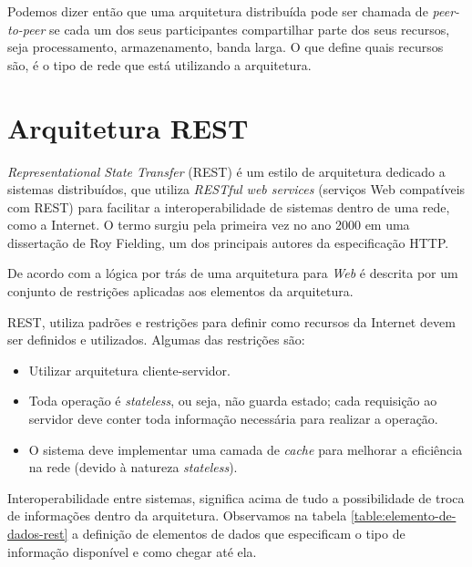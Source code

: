 Podemos dizer então que uma arquitetura distribuída pode ser chamada de \textit{peer-to-peer} se cada um dos seus participantes compartilhar parte dos seus recursos, seja processamento,  armazenamento, banda larga. O que define quais recursos são, é o tipo de rede que está utilizando a arquitetura. 

\section{Arquitetura REST}

\textit{Representational State Transfer} (REST) é um estilo de arquitetura dedicado a sistemas distribuídos, que utiliza \textit{RESTful web services} (serviços Web compatíveis com REST) para facilitar a interoperabilidade de sistemas dentro de uma rede, como a Internet. O termo surgiu pela primeira vez no ano 2000 em uma dissertação de Roy Fielding, um dos principais autores da especificação HTTP.

De acordo com \cite{restroyfielding2000} a lógica por trás de uma arquitetura para \textit{Web} é descrita por um conjunto de restrições aplicadas aos elementos da arquitetura.

REST, utiliza padrões e restrições para definir como recursos da Internet devem ser definidos e utilizados. Algumas das restrições são:
\begin{itemize}
	\item Utilizar arquitetura cliente-servidor.
	\item Toda operação é \textit{stateless}, ou seja, não guarda estado; cada requisição ao servidor deve conter toda informação necessária para realizar a operação.
	\item O sistema deve implementar uma camada de \textit{cache} para melhorar a eficiência na rede (devido à natureza \textit{stateless}).
\end{itemize}

Interoperabilidade entre sistemas, significa acima de tudo a possibilidade de troca de informações dentro da arquitetura. Observamos na tabela \ref{table:elemento-de-dados-rest} a definição de elementos de dados que especificam o tipo de informação disponível e como chegar até ela.

